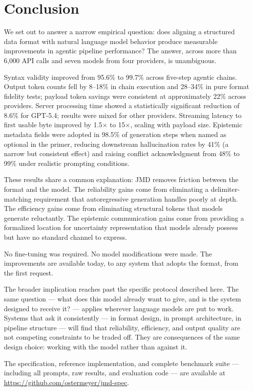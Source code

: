 \documentclass[11pt]{article}
\begin{document}
\section{Conclusion}

We set out to answer a narrow empirical question: does aligning a structured data format with natural language model behavior produce measurable improvements in agentic pipeline performance? The answer, across more than 6,000 API calls and seven models from four providers, is unambiguous.

Syntax validity improved from 95.6\% to 99.7\% across five-step agentic chains. Output token counts fell by 8--18\% in chain execution and 28--34\% in pure format fidelity tests; payload token savings were consistent at approximately 22\% across providers. Server processing time showed a statistically significant reduction of 8.6\% for GPT-5.4; results were mixed for other providers. Streaming latency to first usable byte improved by 1.5$\times$ to 15$\times$, scaling with payload size. Epistemic metadata fields were adopted in 98.5\% of generation steps when named as optional in the primer, reducing downstream hallucination rates by 41\% (a narrow but consistent effect) and raising conflict acknowledgment from 48\% to 99\% under realistic prompting conditions.

These results share a common explanation: JMD removes friction between the format and the model. The reliability gains come from eliminating a delimiter-matching requirement that autoregressive generation handles poorly at depth. The efficiency gains come from eliminating structural tokens that models generate reluctantly. The epistemic communication gains come from providing a formalized location for uncertainty representation that models already possess but have no standard channel to express.

No fine-tuning was required. No model modifications were made. The improvements are available today, to any system that adopts the format, from the first request.

The broader implication reaches past the specific protocol described here. The same question --- what does this model already want to give, and is the system designed to receive it? --- applies wherever language models are put to work. Systems that ask it consistently --- in format design, in prompt architecture, in pipeline structure --- will find that reliability, efficiency, and output quality are not competing constraints to be traded off. They are consequences of the same design choice: working with the model rather than against it.

The specification, reference implementation, and complete benchmark suite --- including all prompts, raw results, and evaluation code --- are available at \url{https://github.com/ostermeyer/jmd-spec}.


\end{document}
